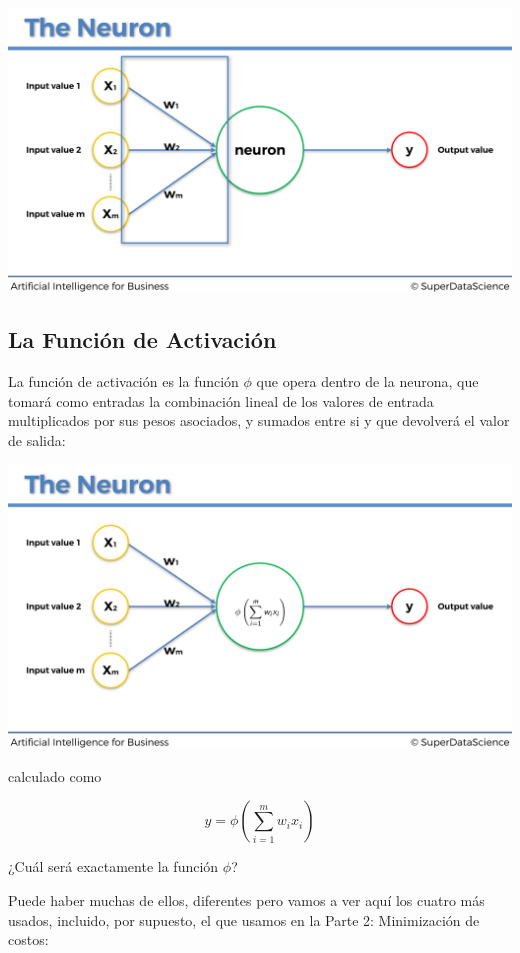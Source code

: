 \documentclass[
]{book}
\begin{document}
\includegraphics{Images/ANN_8.png}

\hypertarget{la-funciuxf3n-de-activaciuxf3n}{%
\subsection{La Función de Activación}\label{la-funciuxf3n-de-activaciuxf3n}}

La función de activación es la función \(\phi\) que opera dentro de la neurona, que tomará como entradas la combinación lineal de los valores de entrada multiplicados por sus pesos asociados, y sumados entre si y que devolverá el valor de salida:

\includegraphics{Images/ANN_9.png}

calculado como

\[y = \phi\left( \sum_{i=1}^m w_i x_i \right)\]

¿Cuál será exactamente la función \(\phi\)?

Puede haber muchas de ellos, diferentes pero vamos a ver aquí los cuatro más usados, incluido, por supuesto, el que usamos en la Parte 2: Minimización de costos:
\end{document}
